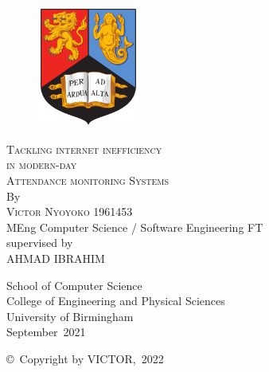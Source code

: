 \thispagestyle{empty}
\providecommand\pdfbookmark[3][]{} \pdfbookmark[0]{Title Page}{bm:Title}
\vspace*{1cm}
\begin{figure}[ht!]
\includegraphics[height=4cm]{frontmatter/images/BirminghamUniversityCrest.png}
\end{figure}
\vfill
\begin{flushleft}
\textsc{\huge{Tackling internet inefficiency }}\\[0.5em]
\textsc{\huge{in modern-day}}\\[0.5em]
\textsc{\huge{Attendance monitoring Systems}}\\[0.5em]
\vfill
By\\[\baselineskip]
\textsc{\Large{Victor Nyoyoko}}
\vfill
1961453\\[-0.8em]
MEng Computer Science / Software Engineering FT\\[-0.8em]
\vfill
supervised by\\[-0.8em]
\vfill
\MakeUppercase{AHMAD IBRAHIM} \\[\baselineskip]
\end{flushleft}
\begin{flushright}
School of Computer Science\\[-0.8em]
College of Engineering and Physical Sciences\\[-0.8em]
University of Birmingham\\[-0.8em]
September~2021 \\[\baselineskip]
\end{flushright}
\copyright\ Copyright by \MakeUppercase{\@Nyoyoko Victor},~\@2022\
\clearpage
